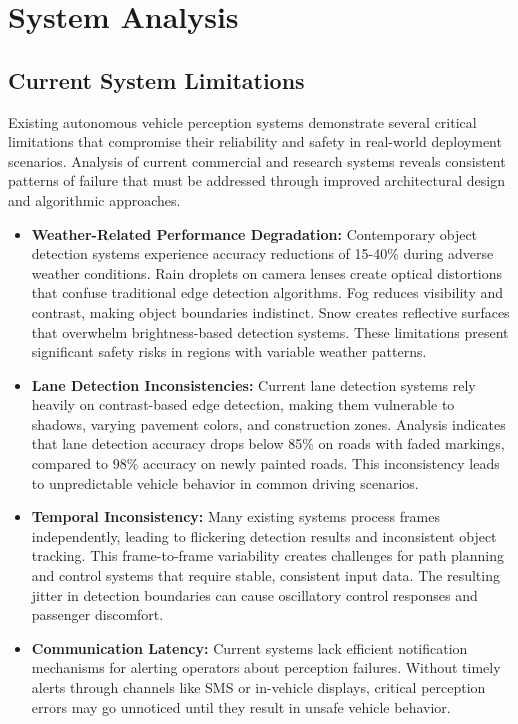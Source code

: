 \chapter{System Analysis}
\section{Current System Limitations}
\begin{doublespace}
Existing autonomous vehicle perception systems demonstrate several critical limitations that compromise their reliability and safety in real-world deployment scenarios. Analysis of current commercial and research systems reveals consistent patterns of failure that must be addressed through improved architectural design and algorithmic approaches.

\begin{itemize}[leftmargin=*,nosep]
    \item \textbf{Weather-Related Performance Degradation:} Contemporary object detection systems experience accuracy reductions of 15-40\% during adverse weather conditions. Rain droplets on camera lenses create optical distortions that confuse traditional edge detection algorithms. Fog reduces visibility and contrast, making object boundaries indistinct. Snow creates reflective surfaces that overwhelm brightness-based detection systems. These limitations present significant safety risks in regions with variable weather patterns.
    
    \item \textbf{Lane Detection Inconsistencies:} Current lane detection systems rely heavily on contrast-based edge detection, making them vulnerable to shadows, varying pavement colors, and construction zones. Analysis indicates that lane detection accuracy drops below 85\% on roads with faded markings, compared to 98\% accuracy on newly painted roads. This inconsistency leads to unpredictable vehicle behavior in common driving scenarios.
    
    \item \textbf{Temporal Inconsistency:} Many existing systems process frames independently, leading to flickering detection results and inconsistent object tracking. This frame-to-frame variability creates challenges for path planning and control systems that require stable, consistent input data. The resulting jitter in detection boundaries can cause oscillatory control responses and passenger discomfort.
    
    \item \textbf{Communication Latency:} Current systems lack efficient notification mechanisms for alerting operators about perception failures. Without timely alerts through channels like SMS or in-vehicle displays, critical perception errors may go unnoticed until they result in unsafe vehicle behavior.
\end{itemize}
\end{doublespace}

